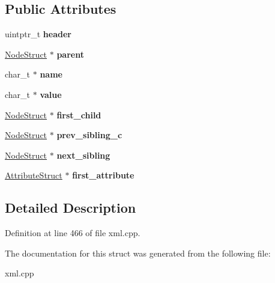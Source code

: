 \subsection*{Public Attributes}
\begin{DoxyCompactItemize}
\item 
\hypertarget{structphys_1_1xml_1_1NodeStruct_a68ff269f03bdab91cbeb96174d4df3a8}{
uintptr\_\-t {\bfseries header}}
\label{d7/dd5/structphys_1_1xml_1_1NodeStruct_a68ff269f03bdab91cbeb96174d4df3a8}

\item 
\hypertarget{structphys_1_1xml_1_1NodeStruct_a691cde3ddaad2c7dacf780a6c4b9c8fe}{
\hyperlink{structphys_1_1xml_1_1NodeStruct}{NodeStruct} $\ast$ {\bfseries parent}}
\label{d7/dd5/structphys_1_1xml_1_1NodeStruct_a691cde3ddaad2c7dacf780a6c4b9c8fe}

\item 
\hypertarget{structphys_1_1xml_1_1NodeStruct_aa5b83907bbb2a8d90b0ce8be10e30be2}{
char\_\-t $\ast$ {\bfseries name}}
\label{d7/dd5/structphys_1_1xml_1_1NodeStruct_aa5b83907bbb2a8d90b0ce8be10e30be2}

\item 
\hypertarget{structphys_1_1xml_1_1NodeStruct_afc220369e23ebde109283016277c715c}{
char\_\-t $\ast$ {\bfseries value}}
\label{d7/dd5/structphys_1_1xml_1_1NodeStruct_afc220369e23ebde109283016277c715c}

\item 
\hypertarget{structphys_1_1xml_1_1NodeStruct_a54bd4cd90f2d96af65396da7ec25b64e}{
\hyperlink{structphys_1_1xml_1_1NodeStruct}{NodeStruct} $\ast$ {\bfseries first\_\-child}}
\label{d7/dd5/structphys_1_1xml_1_1NodeStruct_a54bd4cd90f2d96af65396da7ec25b64e}

\item 
\hypertarget{structphys_1_1xml_1_1NodeStruct_ab803e620f77fc53cdbb313702e9de966}{
\hyperlink{structphys_1_1xml_1_1NodeStruct}{NodeStruct} $\ast$ {\bfseries prev\_\-sibling\_\-c}}
\label{d7/dd5/structphys_1_1xml_1_1NodeStruct_ab803e620f77fc53cdbb313702e9de966}

\item 
\hypertarget{structphys_1_1xml_1_1NodeStruct_ac27e3b46b9dba081310408320ff66301}{
\hyperlink{structphys_1_1xml_1_1NodeStruct}{NodeStruct} $\ast$ {\bfseries next\_\-sibling}}
\label{d7/dd5/structphys_1_1xml_1_1NodeStruct_ac27e3b46b9dba081310408320ff66301}

\item 
\hypertarget{structphys_1_1xml_1_1NodeStruct_a5491eb5936a4b99cd2447332e4a9fdb2}{
\hyperlink{structphys_1_1xml_1_1AttributeStruct}{AttributeStruct} $\ast$ {\bfseries first\_\-attribute}}
\label{d7/dd5/structphys_1_1xml_1_1NodeStruct_a5491eb5936a4b99cd2447332e4a9fdb2}

\end{DoxyCompactItemize}


\subsection{Detailed Description}


Definition at line 466 of file xml.cpp.



The documentation for this struct was generated from the following file:\begin{DoxyCompactItemize}
\item 
xml.cpp\end{DoxyCompactItemize}
